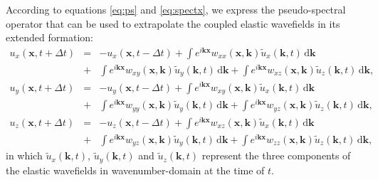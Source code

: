 According to equations \ref{eq:ps} and \ref{eq:spectx}, we express the pseudo-spectral operator that can be used to extrapolate
the coupled elastic wavefields in its extended formation:
\begin{equation}
\begin{array}{lcl}
\label{eq:extrap3}
u_{x}(\mathbf{x},t+\Delta{t})&=&-u_{x}(\mathbf{x},t-\Delta{t})
+\int{e^{i\mathbf{k}\mathbf{x}}w_{xx}(\mathbf{x},\mathbf{k})\tilde{u}_x(\mathbf{k},t)}\,\mathrm{d}\mathbf{k}
\\
&+&\int{e^{i\mathbf{k}\mathbf{x}}w_{xy}(\mathbf{x},\mathbf{k})\tilde{u}_y(\mathbf{k},t)}\,\mathrm{d}\mathbf{k}
+\int{e^{i\mathbf{k}\mathbf{x}}w_{xz}(\mathbf{x},\mathbf{k})\tilde{u}_z(\mathbf{k},t)}\,\mathrm{d}\mathbf{k}, \\
u_{y}(\mathbf{x},t+\Delta{t})&=&-u_{y}(\mathbf{x},t-\Delta{t})
+\int{e^{i\mathbf{k}\mathbf{x}}w_{xy}(\mathbf{x},\mathbf{k})\tilde{u}_x(\mathbf{k},t)}\,\mathrm{d}\mathbf{k}
\\
&+&\int{e^{i\mathbf{k}\mathbf{x}}w_{yy}(\mathbf{x},\mathbf{k})\tilde{u}_y(\mathbf{k},t)}\,\mathrm{d}\mathbf{k}
+\int{e^{i\mathbf{k}\mathbf{x}}w_{yz}(\mathbf{x},\mathbf{k})\tilde{u}_z(\mathbf{k},t)}\,\mathrm{d}\mathbf{k}, \\
u_{z}(\mathbf{x},t+\Delta{t})&=&-u_{z}(\mathbf{x},t-\Delta{t})
+\int{e^{i\mathbf{k}\mathbf{x}}w_{xz}(\mathbf{x},\mathbf{k})\tilde{u}_x(\mathbf{k},t)}\,\mathrm{d}\mathbf{k}
\\
&+&\int{e^{i\mathbf{k}\mathbf{x}}w_{yz}(\mathbf{x},\mathbf{k})\tilde{u}_y(\mathbf{k},t)}\,\mathrm{d}\mathbf{k}
+\int{e^{i\mathbf{k}\mathbf{x}}w_{zz}(\mathbf{x},\mathbf{k})\tilde{u}_z(\mathbf{k},t)}\,\mathrm{d}\mathbf{k},
\end{array}
\end{equation}
in which $\tilde{u}_x(\mathbf{k},t)$, $\tilde{u}_y(\mathbf{k},t)$ and $\tilde{u}_z(\mathbf{k},t)$ represent the three
	components of the elastic wavefields in wavenumber-domain at the time of $t$.

